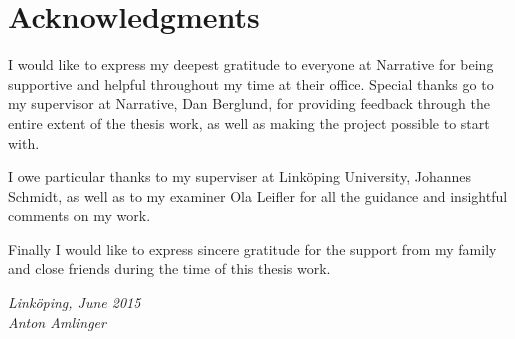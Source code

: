 \chapter*{Acknowledgments}
I would like to express my deepest gratitude to everyone at Narrative
for being supportive and helpful throughout my time at their office.
Special thanks go to my supervisor at Narrative, Dan Berglund, for 
providing feedback through the entire extent of the thesis work, as
well as making the project possible to start with.

I owe particular thanks to my superviser at Linköping University,
Johannes Schmidt, as well as to my examiner Ola Leifler for all the
guidance and insightful comments on my work.

Finally I would like to express sincere gratitude for the support 
from my family and close friends during the time of this thesis work.

\begin{flushright}
    \emph{Linköping, June 2015}\\
    \emph{Anton Amlinger}
\end{flushright}
